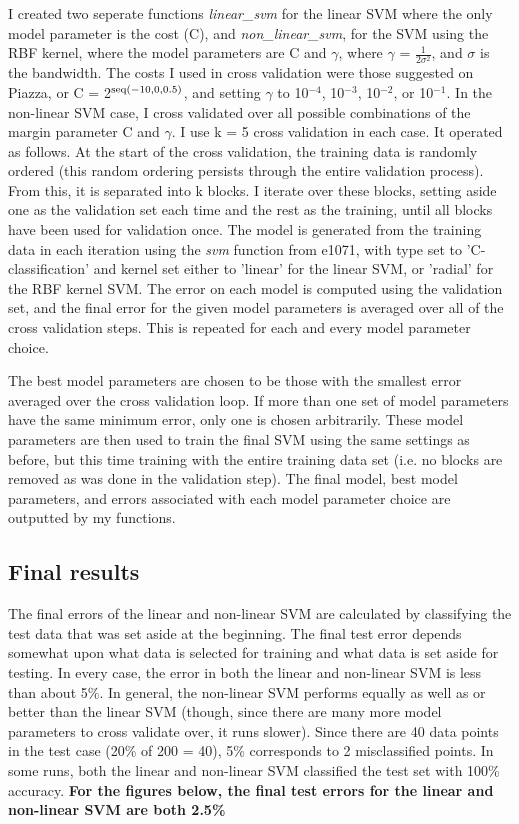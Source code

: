 \documentclass[12pt]{article}%
\begin{document}
I created two seperate functions \textit{linear\_svm} for the linear SVM where the only model parameter is the cost (C), and \textit{non\_linear\_svm}, for the SVM using the RBF kernel, where the model parameters are C and $\gamma$, where $\gamma$ = $\frac{1}{2\sigma^{2}}$, and $\sigma$ is the bandwidth. The costs I used in cross validation were those suggested on Piazza, or C = 2$^{\rm{seq(-10,0,0.5)}}$, and setting $\gamma$ to 10$^{-4}$, 10$^{-3}$, 10$^{-2}$, or 10$^{-1}$. In the non-linear SVM case, I cross validated over all possible combinations of the margin parameter C and $\gamma$. I use k = 5 cross validation in each case. It operated as follows. At the start of the cross validation, the training data is randomly ordered (this random ordering persists through the entire validation process). From this, it is separated into k blocks. I iterate over these blocks, setting aside one as the validation set each time and the rest as the training, until all blocks have been used for validation once. The model is generated from the training data in each iteration using the \textit{svm} function from e1071, with type set to 'C-classification' and kernel set either to 'linear' for the linear SVM, or 'radial' for the RBF kernel SVM. The error on each model is computed using the validation set, and the final error for the given model parameters is averaged over all of the cross validation steps. This is repeated for each and every model parameter choice.

The best model parameters are chosen to be those with the smallest error averaged over the cross validation loop. If more than one set of model parameters have the same minimum error, only one is chosen arbitrarily. These model parameters are then used to train the final SVM using the same settings as before, but this time training with the entire training data set (i.e. no blocks are removed as was done in the validation step). The final model, best model parameters, and errors associated with each model parameter choice are outputted by my functions.

\subsection{Final results}
The final errors of the linear and non-linear SVM are calculated by classifying the test data that was set aside at the beginning. The final test error depends somewhat upon what data is selected for training and what data is set aside for testing. In every case, the error in both the linear and non-linear SVM is less than about 5\%. In general, the non-linear SVM performs equally as well as or better than the linear SVM (though, since there are many more model parameters to cross validate over, it runs slower). Since there are 40 data points in the test case (20\% of 200 = 40), 5\% corresponds to 2 misclassified points. In some runs, both the linear and non-linear SVM classified the test set with 100\% accuracy. \textbf{For the figures below, the final test errors for the linear and non-linear SVM are both 2.5\%}
\end{document}
